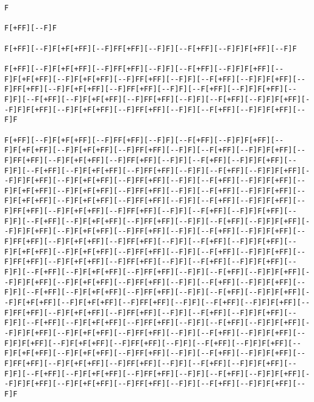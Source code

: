 \documentclass[
]{article}
\begin{document}
\begin{verbatim}
F

F[+FF][--F]F

F[+FF][--F]F[+F[+FF][--F]FF[+FF][--F]F][--F[+FF][--F]F]F[+FF][--F]F

F[+FF][--F]F[+F[+FF][--F]FF[+FF][--F]F][--F[+FF][--F]F]F[+FF][--F]F[+F[+FF][--F]F[+F[+FF][--F]FF[+FF][--F]F][--F[+FF][--F]F]F[+FF][--F]FF[+FF][--F]F[+F[+FF][--F]FF[+FF][--F]F][--F[+FF][--F]F]F[+FF][--F]F][--F[+FF][--F]F[+F[+FF][--F]FF[+FF][--F]F][--F[+FF][--F]F]F[+FF][--F]F]F[+FF][--F]F[+F[+FF][--F]FF[+FF][--F]F][--F[+FF][--F]F]F[+FF][--F]F

F[+FF][--F]F[+F[+FF][--F]FF[+FF][--F]F][--F[+FF][--F]F]F[+FF][--F]F[+F[+FF][--F]F[+F[+FF][--F]FF[+FF][--F]F][--F[+FF][--F]F]F[+FF][--F]FF[+FF][--F]F[+F[+FF][--F]FF[+FF][--F]F][--F[+FF][--F]F]F[+FF][--F]F][--F[+FF][--F]F[+F[+FF][--F]FF[+FF][--F]F][--F[+FF][--F]F]F[+FF][--F]F]F[+FF][--F]F[+F[+FF][--F]FF[+FF][--F]F][--F[+FF][--F]F]F[+FF][--F]F[+F[+FF][--F]F[+F[+FF][--F]FF[+FF][--F]F][--F[+FF][--F]F]F[+FF][--F]F[+F[+FF][--F]F[+F[+FF][--F]FF[+FF][--F]F][--F[+FF][--F]F]F[+FF][--F]FF[+FF][--F]F[+F[+FF][--F]FF[+FF][--F]F][--F[+FF][--F]F]F[+FF][--F]F][--F[+FF][--F]F[+F[+FF][--F]FF[+FF][--F]F][--F[+FF][--F]F]F[+FF][--F]F]F[+FF][--F]F[+F[+FF][--F]FF[+FF][--F]F][--F[+FF][--F]F]F[+FF][--F]FF[+FF][--F]F[+F[+FF][--F]FF[+FF][--F]F][--F[+FF][--F]F]F[+FF][--F]F[+F[+FF][--F]F[+F[+FF][--F]FF[+FF][--F]F][--F[+FF][--F]F]F[+FF][--F]FF[+FF][--F]F[+F[+FF][--F]FF[+FF][--F]F][--F[+FF][--F]F]F[+FF][--F]F][--F[+FF][--F]F[+F[+FF][--F]FF[+FF][--F]F][--F[+FF][--F]F]F[+FF][--F]F]F[+FF][--F]F[+F[+FF][--F]FF[+FF][--F]F][--F[+FF][--F]F]F[+FF][--F]F][--F[+FF][--F]F[+F[+FF][--F]FF[+FF][--F]F][--F[+FF][--F]F]F[+FF][--F]F[+F[+FF][--F]F[+F[+FF][--F]FF[+FF][--F]F][--F[+FF][--F]F]F[+FF][--F]FF[+FF][--F]F[+F[+FF][--F]FF[+FF][--F]F][--F[+FF][--F]F]F[+FF][--F]F][--F[+FF][--F]F[+F[+FF][--F]FF[+FF][--F]F][--F[+FF][--F]F]F[+FF][--F]F]F[+FF][--F]F[+F[+FF][--F]FF[+FF][--F]F][--F[+FF][--F]F]F[+FF][--F]F]F[+FF][--F]F[+F[+FF][--F]FF[+FF][--F]F][--F[+FF][--F]F]F[+FF][--F]F[+F[+FF][--F]F[+F[+FF][--F]FF[+FF][--F]F][--F[+FF][--F]F]F[+FF][--F]FF[+FF][--F]F[+F[+FF][--F]FF[+FF][--F]F][--F[+FF][--F]F]F[+FF][--F]F][--F[+FF][--F]F[+F[+FF][--F]FF[+FF][--F]F][--F[+FF][--F]F]F[+FF][--F]F]F[+FF][--F]F[+F[+FF][--F]FF[+FF][--F]F][--F[+FF][--F]F]F[+FF][--F]F
\end{verbatim}
\end{document}
